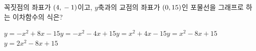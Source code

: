 꼭짓점의 좌표가 $(4{,}\mkern3mu -1)$이고, $y$축과의 교점의 좌표가 $(0{,}\mkern3mu 15)$인 포물선을 그래프로 하는 이차함수의 식은?
\begin{choicesii}{$y=-x^2+8x-15$}{$y=-x^2-4x+15$}{$y=x^2+4x-15$}{$y=x^2-8x+15$}{$y=2x^2-8x+15$}\end{choicesii}
